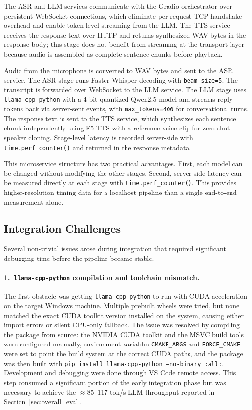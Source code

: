 \documentclass[12pt, a4paper]{article}
\begin{document}
The ASR and LLM services communicate with the Gradio orchestrator over persistent WebSocket connections, which eliminate per-request TCP handshake overhead and enable token-level streaming from the LLM. The TTS service receives the response text over HTTP and returns synthesized WAV bytes in the response body; this stage does not benefit from streaming at the transport layer because audio is assembled as complete sentence chunks before playback.

Audio from the microphone is converted to WAV bytes and sent to the ASR service. The ASR stage runs Faster-Whisper decoding with \texttt{beam\_size=5}. The transcript is forwarded over WebSocket to the LLM service. The LLM stage uses \texttt{llama-cpp-python} with a 4-bit quantized Qwen2.5 model and streams reply tokens back via server-sent events, with \texttt{max\_tokens=400} for conversational turns. The response text is sent to the TTS service, which synthesizes each sentence chunk independently using F5-TTS with a reference voice clip for zero-shot speaker cloning. Stage-level latency is recorded server-side with \texttt{time.perf\_counter()} and returned in the response metadata.

This microservice structure has two practical advantages. First, each model can be changed without modifying the other stages. Second, server-side latency can be measured directly at each stage with \texttt{time.perf\_counter()}. This provides higher-resolution timing data for a localhost pipeline than a single end-to-end measurement alone.

\subsection{Integration Challenges}
\label{sec:integration_challenges}

Several non-trivial issues arose during integration that required significant debugging time before the pipeline became stable.

\paragraph{1.\ \texttt{llama-cpp-python} compilation and toolchain mismatch.}
The first obstacle was getting \texttt{llama-cpp-python} to run with CUDA acceleration on the target Windows machine. Multiple prebuilt wheels were tried, but none matched the exact CUDA toolkit version installed on the system, causing either import errors or silent CPU-only fallback. The issue was resolved by compiling the package from source: the NVIDIA CUDA toolkit and the MSVC build tools were configured manually, environment variables \texttt{CMAKE\_ARGS} and \texttt{FORCE\_CMAKE} were set to point the build system at the correct CUDA paths, and the package was then built with \texttt{pip install llama-cpp-python --no-binary :all:}. Development and debugging were done through VS Code remote access. This step consumed a significant portion of the early integration phase but was necessary to achieve the $\approx$85--117 tok/s LLM throughput reported in Section~\ref{sec:overall_eval}.
\end{document}
